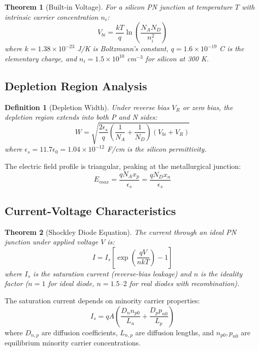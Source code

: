 \documentclass[a4paper, 11pt]{article}
\newtheorem{definition}{Definition}[section]
\newtheorem{theorem}{Theorem}[section]
\begin{document}
\begin{theorem}[Built-in Voltage]
For a silicon PN junction at temperature $T$ with intrinsic carrier concentration $n_i$:
\begin{equation}
V_{bi} = \frac{kT}{q} \ln\left(\frac{N_A N_D}{n_i^2}\right)
\end{equation}
where $k = 1.38 \times 10^{-23}$ J/K is Boltzmann's constant, $q = 1.6 \times 10^{-19}$ C
is the elementary charge, and $n_i = 1.5 \times 10^{10}$ cm$^{-3}$ for silicon at 300 K.
\end{theorem}

\subsection{Depletion Region Analysis}

\begin{definition}[Depletion Width]
Under reverse bias $V_R$ or zero bias, the depletion region extends into both P and N sides:
\begin{equation}
W = \sqrt{\frac{2\epsilon_s}{q}\left(\frac{1}{N_A} + \frac{1}{N_D}\right)(V_{bi} + V_R)}
\end{equation}
where $\epsilon_s = 11.7 \epsilon_0 = 1.04 \times 10^{-12}$ F/cm is the silicon permittivity.
\end{definition}

The electric field profile is triangular, peaking at the metallurgical junction:
\begin{equation}
E_{max} = \frac{qN_A x_p}{\epsilon_s} = \frac{qN_D x_n}{\epsilon_s}
\end{equation}

\subsection{Current-Voltage Characteristics}

\begin{theorem}[Shockley Diode Equation]
The current through an ideal PN junction under applied voltage $V$ is:
\begin{equation}
I = I_s\left[\exp\left(\frac{qV}{nkT}\right) - 1\right]
\end{equation}
where $I_s$ is the saturation current (reverse-bias leakage) and $n$ is the ideality
factor ($n = 1$ for ideal diode, $n = 1.5$--$2$ for real diodes with recombination).
\end{theorem}

The saturation current depends on minority carrier properties:
\begin{equation}
I_s = qA\left(\frac{D_n n_{p0}}{L_n} + \frac{D_p p_{n0}}{L_p}\right)
\end{equation}
where $D_{n,p}$ are diffusion coefficients, $L_{n,p}$ are diffusion lengths, and
$n_{p0}, p_{n0}$ are equilibrium minority carrier concentrations.
\end{document}
